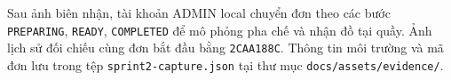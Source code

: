 Sau ảnh biên nhận, tài khoản ADMIN local chuyển đơn theo các bước
\texttt{PREPARING}, \texttt{READY}, \texttt{COMPLETED} để mô phỏng pha chế
và nhận đồ tại quầy. Ảnh lịch sử đối chiếu cùng đơn bắt đầu bằng
\texttt{2CAA188C}. Thông tin môi trường và mã đơn lưu trong tệp
\nolinkurl{sprint2-capture.json} tại thư mục \nolinkurl{docs/assets/evidence/}.
